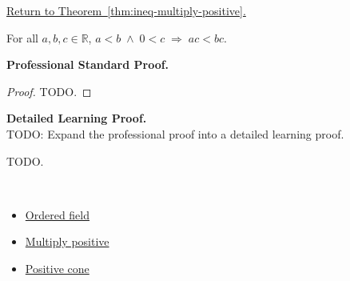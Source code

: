 \newpage
{}
\label{prf:ineq-multiply-positive}

\begin{remark*}[Return]
\hyperref[thm:ineq-multiply-positive]{Return to Theorem~\ref*{thm:ineq-multiply-positive}.}
\end{remark*}

\begin{theorem*}
For all $a, b, c \in \mathbb{R}$,
$a < b \;\land\; 0 < c \;\Rightarrow\; ac < bc$.
\end{theorem*}

\textbf{Professional Standard Proof.}~\\
\begin{proof}
TODO.
\end{proof}

\textbf{Detailed Learning Proof.}~\\
TODO: Expand the professional proof into a detailed learning proof.


\begin{remark*}
TODO.
\end{remark*}

\begin{remark*}[Dependencies]~\\
\begin{itemize}
  \item \hyperref[def:ordered-field]{Ordered field}
  \item \hyperref[thm:multiply-positive]{Multiply positive}
  \item \hyperref[def:positive-cone]{Positive cone}
\end{itemize}
\end{remark*}
